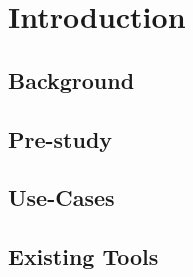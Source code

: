 \chapter{Introduction}

\section{Background}


\section{Pre-study}


\section{Use-Cases}


\section{Existing Tools}

